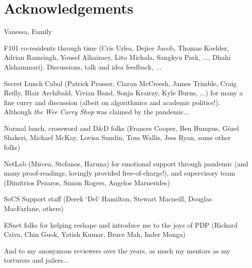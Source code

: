 \chapter*{Acknowledgements}

Vanessa, Family

F101 co-residents through time (Cris Urlea, Dejice Jacob, Thomas Koehler, Adrian Ramsingh, Yousef Alhaizaey, Lito Michala, Sangkyu Park, ..., Dhahi Alshammari). Discussions, talk and idea feedback, ...

Secret Lunch Cabal (Patrick Prosser, Ciaran McCreesh, James Trimble, Craig Reilly, Blair Archibald, Vivian Band, Sonja Kraiczy, Kyle Burns, ...) for many a fine curry and discussion (albeit on algorithmics and academic politics!). Although \emph{the Wee Curry Shop} was claimed by the pandemic...

Normal lunch, crossword and D\&D folks (Frances Cooper, Ben Bumpus, G\"{o}zel Shakeri, Michael McKay, Lovisa Sundin, Tom Wallis, Jess Ryan, some other folks)

NetLab (Mircea, Stefanos, Haruna) for emotional support through pandemic (and many proof-readings, lovingly provided free-of-charge!), and supervisory team (Dimitrios Pezaros, Simon Rogers, Angelos Marnerides)

SoCS Support staff (Derek `Del' Hamilton, Stewart Macneill, Douglas MacFarlane, others)

ESnet folks for helping reshape and introduce me to the joys of PDP (Richard Cziva, Chin Guok, Yatish Kumar, Bruce Mah, Inder Monga)

And to my anonymous reviewers over the years, as much my mentors as my torturers and jailers...